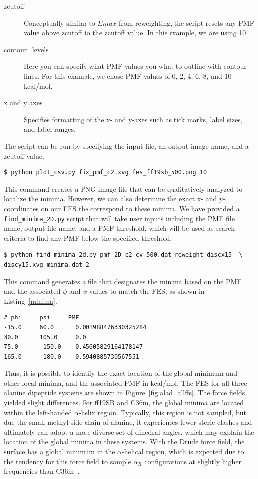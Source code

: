 \documentclass[9pt,tutorial,pubversion]{livecoms}
\begin{document}
\begin{description}
    \item[zcutoff] Conceptually similar to $Emax$ from reweighting, the script resets any PMF value above zcutoff to the zcutoff value. In this example, we are using 10.
    \item[contour\_levels] Here you can specify what PMF values you what to outline with contour lines. For this example, we chose PMF values of 0, 2, 4, 6, 8, and 10 kcal/mol.
    \item[x and y axes] Specifies formatting of the x- and y-axes such as tick marks, label sizes, and label ranges.
\end{description}

The script can be run by specifying the input file, an output image name, and a zcutoff value. 

\begin{lstlisting}[style=MyBash]
$ python plot_csv.py fix_pmf_c2.xvg fes_ff19sb_500.png 10
\end{lstlisting}

This command creates a PNG image file that can be qualitatively analyzed to localize the minima. However, we can also determine the exact x- and y-coordinates on our FES the correspond to these minima. We have provided a \texttt{find\_minima\_2D.py} script that will take user inputs including the PMF file name, output file name, and a PMF threshold, which will be used as search criteria to find any PMF below the specified threshold.

\begin{lstlisting}[style=MyBash]
$ python find_minima_2d.py pmf-2D-c2-cv_500.dat-reweight-discx15- \
discy15.xvg minima.dat 2
\end{lstlisting}

This command generates a file that designates the minima based on the PMF and the associated $\phi$ and $\psi$ values to match the FES, as shown in Listing~\ref{minima}. 

\begin{lstlisting}[label=minima, caption=minima.dat, basicstyle=\small, backgroundcolor=\color{light-gray}]
# phi     psi     PMF 
-15.0     60.0      0.001988476330325284
30.0      105.0     0.0
75.0      -150.0    0.45605829164178147
165.0     -180.0    0.5940885730567551
\end{lstlisting}

Thus, it is possible to identify the exact location of the global minimum and other local minima, and the associated PMF in kcal/mol. The FES for all three alanine dipeptide systems are shown in Figure~\ref{fig:alad_allffs}. The force fields yielded slight differences. For ff19SB and C36m, the global minima are located within the left-handed $\alpha$-helix region. Typically, this region is not sampled, but due the small methyl side chain of alanine, it experiences fewer steric clashes and ultimately can adopt a more diverse set of dihedral angles, which may explain the location of the global minima in these systems. With the Drude force field, the surface has a global minimum in the $\alpha$-helical region, which is expected due to the tendency for this force field to sample $\alpha_R$ configurations at slightly higher frequencies than C36m~\cite{lin_further_2020}.
\end{document}
